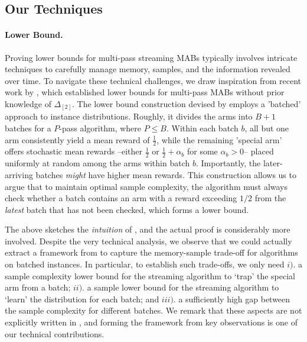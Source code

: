 \subsection{Our Techniques}
\label{sec:tech-overview}

\paragraph{Lower Bound.} Proving lower bounds for multi-pass streaming MABs typically involves intricate techniques to carefully manage memory, samples, and the information revealed over time. To navigate these technical challenges, we draw inspiration from recent work by \cite{AW23BestArm}, which established lower bounds for multi-pass MABs without prior knowledge of $\Delta_{[2]}$. The lower bound construction devised by \cite{AW23BestArm} employs a 'batched' approach to instance distributions. Roughly, it divides the arms into $B+1$ batches for a $P$-pass algorithm, where $P\leq B$. Within each batch $b$, all but one arm consistently yield a mean reward of $\frac{1}{2}$, while the remaining 'special arm' offers stochastic mean rewards --either $\frac{1}{2}$ or $\frac{1}{2}+\alpha_{b}$ for some $\alpha_{b}>0$-- placed uniformly at random among the arms within batch $b$. Importantly, the later-arriving batches \emph{might} have higher mean rewards. This construction allows us to argue that to maintain optimal sample complexity, the algorithm must always check whether a batch contains an arm with a reward exceeding $1/2$ from the \emph{latest} batch that has not been checked, which forms a lower bound.
	
	
	The above sketches the \emph{intuition} of \cite{AW23BestArm}, and the actual proof is considerably more involved. Despite the very technical analysis, we observe that we could actually extract a framework from \cite{AW23BestArm} to capture the memory-sample trade-off for algorithms on batched instances. In particular, to establish such trade-offs, we only need $i).$ a sample complexity lower bound for the streaming algorithm to `trap' the special arm from a batch; $ii).$ a sample lower bound for the streaming algorithm to `learn' the distribution for each batch; and $iii).$ a sufficiently high gap between the sample complexity for different batches. We remark that these aspects are not explicitly written in \cite{AW23BestArm}, and forming the framework from key observations is one of our technical contributions.
	
